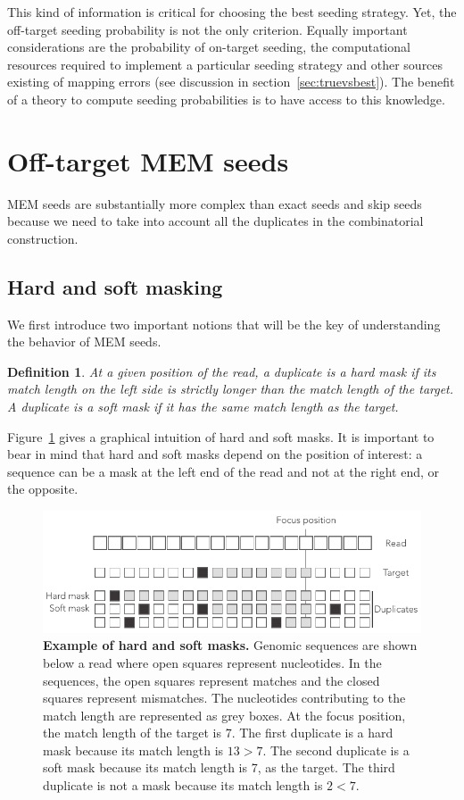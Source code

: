 \documentclass{article}
\newtheorem{definition}{Definition}
\begin{document}
This kind of information is critical for choosing the best seeding
strategy. Yet, the off-target seeding probability is not the only
criterion. Equally important considerations are the probability of
on-target seeding, the computational resources required to implement a
particular seeding strategy and other sources existing of mapping errors
(see discussion in section~\ref{sec:truevsbest}). The benefit of a theory
to compute seeding probabilities is to have access to this knowledge.


\section{Off-target MEM seeds}
\label{sec_offMEM}

MEM seeds are substantially more complex than exact seeds and skip seeds
because we need to take into account all the duplicates in the
combinatorial construction.


\subsection{Hard and soft masking}

We first introduce two important notions that will be the key of
understanding the behavior of MEM seeds.

\begin{definition}
At a given position of the read, a duplicate is a \emph{hard mask} if its
match length on the left side is strictly longer than the match length
of the target. A duplicate is a \emph{soft mask} if it has the same match
length as the target.
\end{definition}

Figure~\ref{fig:hard_vs_soft_masks} gives a graphical intuition of hard and
soft masks. It is important to bear in mind that hard and soft masks
depend on the position of interest: a sequence can be a mask at the left
end of the read and not at the right end, or the opposite.

\begin{figure}[h]
\centering
\includegraphics[scale=0.85]{hard_vs_soft_masks.pdf}
\caption{\textbf{Example of hard and soft masks.}
Genomic sequences are shown below a read where open squares represent
nucleotides. In the sequences, the open squares represent matches and the
closed squares represent mismatches. The nucleotides contributing to the
match length are represented as grey boxes. At the focus position, the
match length of the target is 7. The first duplicate is a hard mask
because its match length is $13>7$. The second duplicate is a soft mask
because its match length is 7, as the target. The third duplicate is not
a mask because its match length is $2<7$.}
\label{fig:hard_vs_soft_masks}
\end{figure}
\end{document}
